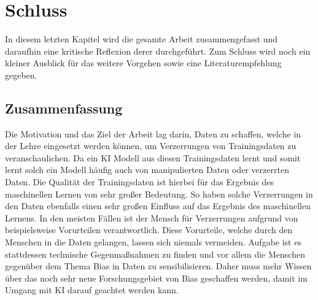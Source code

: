\chapter{Schluss}
\label{sec:schluss}
\begin{onehalfspace}
    In diesem letzten Kapitel wird die gesamte Arbeit zusammengefasst und daraufhin eine kritische Reflexion derer durchgeführt. Zum Schluss wird noch ein kleiner Ausblick für das weitere Vorgehen sowie eine Literaturempfehlung gegeben.
\section{Zusammenfassung}
\label{zusammenfassung}
Die Motivation und das Ziel der Arbeit lag darin, Daten zu schaffen, welche in der Lehre eingesetzt werden können, um Verzerrungen von Trainingsdaten zu veranschaulichen. Da ein \ac{KI} Modell aus diesen Trainingsdaten lernt und somit lernt solch ein Modell häufig auch von manipulierten Daten oder verzerrten Daten. Die Qualität der Trainingsdaten ist hierbei für das Ergebnis des maschinellen Lernen von sehr großer Bedeutung. So haben solche Verzerrungen in den Daten ebenfalls einen sehr großen Einfluss auf das Ergebnis des maschinellen Lernens. In den meisten Fällen ist der Mensch für Verzerrungen aufgrund von beispielsweise Vorurteilen verantwortlich. Diese Vorurteile, welche durch den Menschen in die Daten gelangen, lassen sich niemals vermeiden. Aufgabe ist es stattdessen technische Gegenmaßnahmen zu finden und vor allem die Menschen gegenüber dem Thema Bias in Daten zu sensibilisieren. Daher muss mehr Wissen über das noch sehr neue Forschungsgebiet von Bias geschaffen werden, damit im Umgang mit KI darauf geachtet werden kann.\\

\end{onehalfspace}
